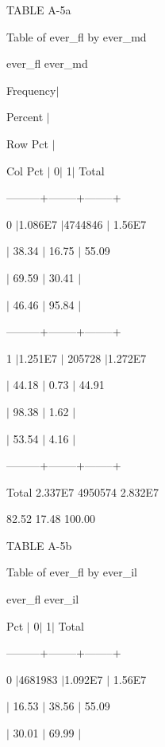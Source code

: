 \begin{multicols}{2}





\textsf{TABLE A-5a}





\textsf{Table of ever{\_}fl by ever{\_}md}

\textsf{ever{\_}fl ever{\_}md}

\textsf{Frequency$\vert $}

\textsf{Percent $\vert $}

\textsf{Row Pct $\vert $}

\textsf{Col Pct $\vert $ 0$\vert $ 1$\vert $ Total}

\textsf{---------+--------+--------+}

\textsf{0 $\vert $1.086E7 $\vert $4744846 $\vert $ 1.56E7}

\textsf{$\vert $ 38.34 $\vert $ 16.75 $\vert $ 55.09}

\textsf{$\vert $ 69.59 $\vert $ 30.41 $\vert $}

\textsf{$\vert $ 46.46 $\vert $ 95.84 $\vert $}

\textsf{---------+--------+--------+}

\textsf{1 $\vert $1.251E7 $\vert $ 205728 $\vert $1.272E7}

\textsf{$\vert $ 44.18 $\vert $ 0.73 $\vert $ 44.91}

\textsf{$\vert $ 98.38 $\vert $ 1.62 $\vert $}

\textsf{$\vert $ 53.54 $\vert $ 4.16 $\vert $}

\textsf{---------+--------+--------+}

\textsf{Total 2.337E7 4950574 2.832E7}

\textsf{82.52 17.48 100.00}

\textsf{TABLE A-5b}





\textsf{Table of ever{\_}fl by ever{\_}il}

\textsf{ever{\_}fl ever{\_}il}

\textsf{Pct $\vert $ 0$\vert $ 1$\vert $ Total}

\textsf{---------+--------+--------+}

\textsf{0 $\vert $4681983 $\vert $1.092E7 $\vert $ 1.56E7}

\textsf{$\vert $ 16.53 $\vert $ 38.56 $\vert $ 55.09}

\textsf{$\vert $ 30.01 $\vert $ 69.99 $\vert $}


\end{multicols}
